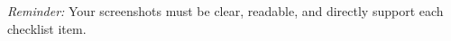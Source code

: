 \documentclass[11pt]{article}
\begin{document}
\vspace{0.5em}
%
%
%
%
%

\vspace{1em}
\noindent\textit{Reminder:} Your screenshots must be clear, readable, and directly support each checklist item.
\end{document}
